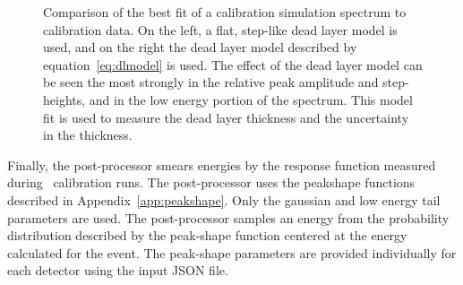 \documentclass[/main.tex]{subfiles}
\begin{document}
\begin{figure}
  \centering
  \caption[Comparison of calibration simulation to data with different dead layer models]{\label{fig:calwithdl}
    Comparison of the best fit of a  calibration simulation spectrum to calibration data. On the left, a flat, step-like dead layer model is used, and on the right the dead layer model described by equation~\ref{eq:dlmodel} is used. The effect of the dead layer model can be seen the most strongly in the relative peak amplitude and step-heights, and in the low energy portion of the spectrum. This model fit is used to measure the dead layer thickness and the uncertainty in the thickness.
  }
\end{figure}

Finally, the post-processor smears energies by the response function measured during \ calibration runs.
The post-processor uses the peakshape functions described in Appendix~\ref{app:peakshape}.
Only the gaussian and low energy tail parameters are used.
The post-processor samples an energy from the probability distribution described by the peak-shape function centered at the energy calculated for the event.
The peak-shape parameters are provided individually for each detector using the input JSON file.
\end{document}
